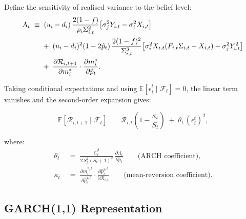 \documentclass[12pt,a4paper]{article}
\newcommand{\E}{\mathbb{E}}
\newcommand{\1}{\mathbf{1}}
\begin{document}
Define the sensitivity of realised variance to the belief level:
\begin{align}
  \Lambda_t \;\equiv\;&\;
  (u_i-d_i)\,\frac{2(1-f)}{\rho_i\Sigma_{i,t}^2}
  \bigl[\sigma_j^2 Y_{i,t} - \sigma_i^2 X_{i,t}\bigr] \notag\\
  &+\;(u_i-d_i)^2(1-2\hat{p}_t)\,
  \frac{2(1-f)^2}{\Sigma_{i,t}^3}
  \bigl[\sigma_i^2 X_{i,t}(F_{i,t}\Sigma_{i,t}-X_{i,t}) - \sigma_j^2 Y_{i,t}^2\bigr] \notag\\
  &+\;\frac{\partial \mathcal{R}_{i,t+1}}{\partial m_i^*}\cdot\frac{\partial m_i^*}{\partial \hat{p}_t}.
  \label{eq:Lambda}
\end{align}

Taking conditional expectations and using $\E[\epsilon_i^t \mid \mathcal{F}_t] = 0$, the linear term vanishes and the second-order expansion gives:

\begin{equation}
  \E[\mathcal{R}_{i,t+1} \mid \mathcal{F}_t]
  \;=\;
  \mathcal{R}_{i,t}\!\left(1 - \frac{\kappa_t}{S_t}\right)
  \;+\;
  \theta_t\,(\epsilon_i^t)^2,
  \label{eq:garch_structure}
\end{equation}

where:
\begin{align}
  \theta_t &\;=\; \frac{\bar{C}_t^2}{2\,S_t^2(S_t+1)^2}\,\frac{\partial \Lambda_t}{\partial \hat{p}_t}
  \qquad\text{(ARCH coefficient)},
  \label{eq:theta}\\
  \kappa_t &\;=\; \frac{\partial m_i^{*,t}}{\partial \hat{p}_i^{j,t}}
  \cdot\frac{\partial \hat{p}_i^{j,t}}{\partial \mathcal{R}_{i,t}}
  \qquad\text{(mean-reversion coefficient)}.
  \label{eq:kappa}
\end{align}

\subsection{GARCH(1,1) Representation}
\end{document}
